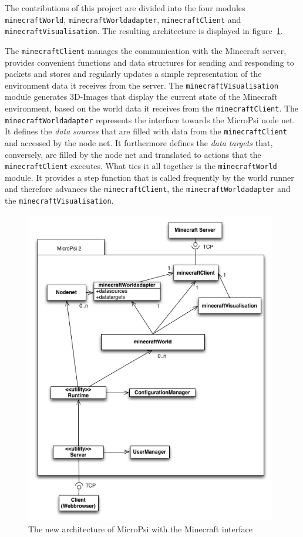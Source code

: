 
The contributions of this project are divided into the four modules \texttt{minecraftWorld}, \texttt{minecraftWorldadapter}, \texttt{minecraftClient} and \texttt{minecraftVisualisation}. The resulting architecture is displayed in figure~\ref{uml_mc}. 

The \texttt{minecraftClient} manages the communication with the Minecraft server, provides convenient functions and data structures for sending and responding to packets and stores and regularly updates a simple representation of the environment data it receives from the server. The \texttt{minecraftVisualisation} module generates 3D-Images that display the current state of the Minecraft environment, based on the world data it receives from the \texttt{minecraftClient}. The \texttt{minecraftWorldadapter} represents the interface towards the MicroPsi node net. It defines the \emph{data sources} that are filled with data from the \texttt{minecraftClient} and accessed by the node net. It furthermore defines the \emph{data targets} that, conversely, are filled by the node net and translated to actions that the \texttt{minecraftClient} executes. What ties it all together is the \texttt{minecraftWorld} module. It provides a step function that is called frequently by the world runner and therefore advances the \texttt{minecraftClient}, the \texttt{minecraftWorldadapter} and the \texttt{minecraftVisualisation}.


\begin{figure}[h]
  \centering
    \includegraphics[width=11cm]{graphics/UML_MicroPsi_mit_spock_v13}
  \caption{The new architecture of MicroPsi with the Minecraft interface}
  \label{uml_mc}
\end{figure}


